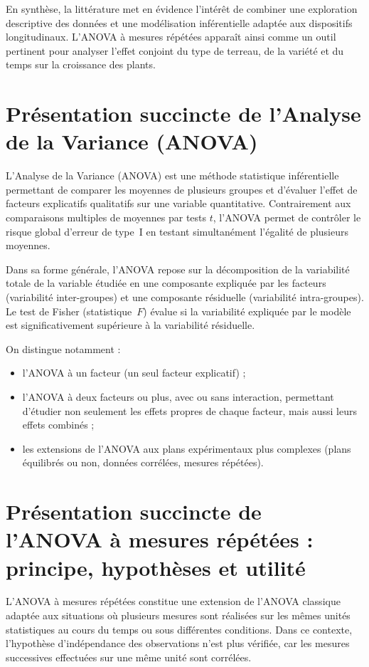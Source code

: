 \documentclass[12pt, a4paper]{report}
\begin{document}
En synthèse, la littérature met en évidence l’intérêt de combiner une exploration descriptive des données et une modélisation inférentielle adaptée aux dispositifs longitudinaux. L’ANOVA à mesures répétées apparaît ainsi comme un outil pertinent pour analyser l’effet conjoint du type de terreau, de la variété et du temps sur la croissance des plants.

\section{Présentation succincte de l'Analyse de la Variance (ANOVA)}

L'Analyse de la Variance (ANOVA) est une méthode statistique inférentielle permettant de
comparer les moyennes de plusieurs groupes et d'évaluer l'effet de facteurs explicatifs
qualitatifs sur une variable quantitative. Contrairement aux comparaisons multiples de
moyennes par tests $t$, l'ANOVA permet de contrôler le risque global d'erreur de type~I en
testant simultanément l'égalité de plusieurs moyennes.

Dans sa forme générale, l'ANOVA repose sur la décomposition de la variabilité totale de la
variable étudiée en une composante expliquée par les facteurs (variabilité inter-groupes) et
une composante résiduelle (variabilité intra-groupes). Le test de Fisher (statistique~$F$)
évalue si la variabilité expliquée par le modèle est significativement supérieure à la
variabilité résiduelle.

On distingue notamment :
\begin{itemize}[leftmargin=*, label=\textbullet]
  \item l'ANOVA à un facteur (un seul facteur explicatif) ;
  \item l'ANOVA à deux facteurs ou plus, avec ou sans interaction, permettant d'étudier
        non seulement les effets propres de chaque facteur, mais aussi leurs effets combinés ;
  \item les extensions de l'ANOVA aux plans expérimentaux plus complexes (plans équilibrés
        ou non, données corrélées, mesures répétées).
\end{itemize}

\section{Présentation succincte de l'ANOVA à mesures répétées : principe, hypothèses et utilité}

L'ANOVA à mesures répétées constitue une extension de l'ANOVA classique adaptée aux
situations où plusieurs mesures sont réalisées sur les mêmes unités statistiques au cours du
temps ou sous différentes conditions. Dans ce contexte, l'hypothèse d'indépendance des
observations n'est plus vérifiée, car les mesures successives effectuées sur une même unité
sont corrélées.
\end{document}
